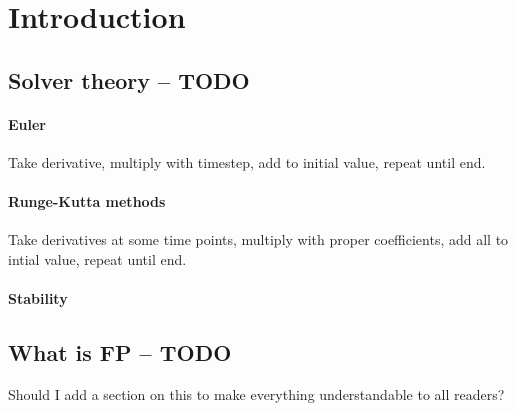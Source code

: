 \chapter{Introduction} 

\section{Solver theory -- TODO}

\subsubsection{Euler}
Take derivative, multiply with timestep, add to initial value, repeat until end.

\subsubsection{Runge-Kutta methods}
Take derivatives at some time points, multiply with proper coefficients, add all to intial value, repeat until end.

\subsubsection{Stability}

\section{What is FP -- TODO}
Should I add a section on this to make everything understandable to all readers?


